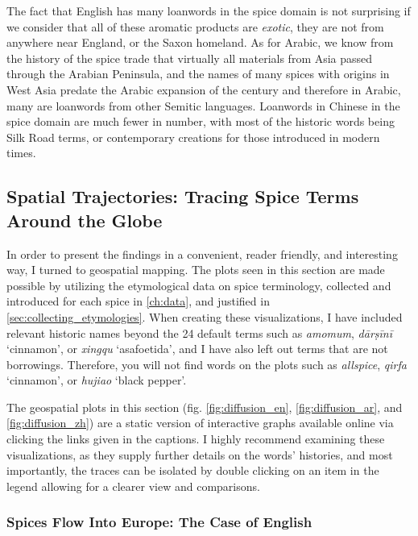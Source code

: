 The fact that English has many loanwords in the spice domain is not surprising if we consider that all of these aromatic products are \emph{exotic}, they are not from anywhere near England, or the Saxon homeland. As for Arabic, we know from the history of the spice trade that virtually all materials from Asia passed through the Arabian Peninsula, and the names of many spices with origins in West Asia predate the Arabic expansion of the  century and therefore in Arabic, many are loanwords from other Semitic languages. Loanwords in Chinese in the spice domain are much fewer in number, with most of the historic words being Silk Road terms, or contemporary creations for those introduced in modern times. 



\subsection{Spatial Trajectories: Tracing Spice Terms Around the Globe}

In order to present the findings in a convenient, reader friendly, and interesting way, I turned to geospatial mapping. The plots seen in this section are made possible by utilizing the etymological data on spice terminology, collected and introduced for each spice in \cref{ch:data}, and justified in \cref{sec:collecting_etymologies}. When creating these visualizations, I have included relevant historic names beyond the 24 default terms such as \textit{amomum}, \textit{dārṣīnī} `cinnamon', or \textit{xingqu} `asafoetida', and I have also left out terms that are not borrowings. Therefore, you will not find words on the plots such as \textit{allspice}, \textit{qirfa} `cinnamon', or \textit{hujiao} `black pepper'.


\begin{note}
  The geospatial plots in this section (fig. \ref{fig:diffusion_en}, \ref{fig:diffusion_ar}, and \ref{fig:diffusion_zh}) are a static version of interactive graphs available online via clicking the links given in the captions. I highly recommend examining these visualizations, as they supply further details on the words' histories, and most importantly, the traces can be isolated by double clicking on an item in the legend allowing for a clearer view and comparisons.
\end{note}

\subsubsection{Spices Flow Into Europe: The Case of English}

